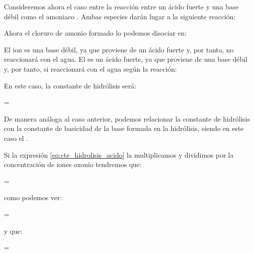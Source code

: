 Consideremos ahora el caso entre la reacción entre un ácido fuerte  y una base débil como el amoniaco .
Ambas especies darán lugar a la siguiente reacción:
\begin{centeredequation}
\end{centeredequation}

Ahora el cloruro de amonio formado lo podemos disociar en:
\begin{centeredequation}
\end{centeredequation}


El ion  es una base débil, ya que proviene de un ácido fuerte y, por tanto, no reaccionará con el agua.
El  es un ácido fuerte, ya que proviene de una base débil y, por tanto, si reaccionará con el agua según la reacción:
\begin{centeredequation}
\end{centeredequation}

En este caso, la constante de hidrólisis será:
\begin{centeredequation}
    \Kh =  \label{eq:cte_hidrolisis_acido}
\end{centeredequation}




De manera análoga al caso anterior, podemos relacionar la constante de hidrólisis con la constante de basicidad de la base formada en la hidrólisis, siendo en este caso el .

Si la expresión \eqref{eq:cte_hidrolisis_acido} la multiplicamos y dividimos por la concentración de iones oxonio  tendremos que:
\begin{centeredequation}
    \Kh = 
\end{centeredequation}

como podemos ver:
\begin{centeredequation}
    \color{blue}  = 
\end{centeredequation}

y que:
\begin{centeredequation}
    \color{red} \Kh = \ 
\end{centeredequation}


